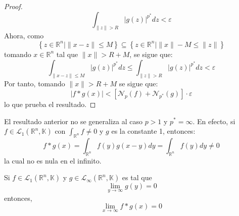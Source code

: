 \documentclass[12pt]{report}
\theoremstyle{largebreak}
\newcommand\abs[1]{\ensuremath{\big|#1\big|}}
\newcommand\norm[1]{\ensuremath{\|#1\|}}
\newcommand{\N}[2]{\ensuremath{\mathcal{N}_{#1}\left(#2\right)}}
\begin{document}
\begin{proof}
        \begin{equation*}
            \int_{ \norm{z}>R}\abs{g(z)}^{p^*}dz<\varepsilon
        \end{equation*}
        Ahora, como 
        \begin{equation*}
            \left\{z\in\mathbb{R}^n\Big|\norm{x-z}\leq M \right\}\subseteq \left\{z\in\mathbb{R}^n\Big|\norm{x}-M\leq\norm{z} \right\}
        \end{equation*}
        tomando $x\in\mathbb{R}^n$ tal que $\norm{x}>R+M$, se sigue que:
        \begin{equation*}
            \int_{\norm{x-z}\leq M }\abs{g(z)}^{ p^*}dz\leq\int_{\norm{z}> R }\abs{g(z)}^{ p^*}dz<\varepsilon
        \end{equation*}
        Por tanto, tomando $\norm{x}>R+M$ se sigue que:
        \begin{equation*}
            \abs{f*g(x)}<\left[\N{p}{f}+\N{p^*}{g} \right]\cdot\varepsilon 
        \end{equation*}
        lo que prueba el resultado.
    \end{proof}

    \begin{obs}
        El resultado anterior no se generaliza al caso $p>1$ y $p^*=\infty$. En efecto, si $f\in\mathcal{L}_1(\mathbb{R}^n,\mathbb{K})$ con $\int_{\mathbb{R}^n}f\neq0$ y $g$ es la constante 1, entonces:
        \begin{equation*}
            f*g(x)=\int_{\mathbb{R}^n}f(y)g(x-y)dy=\int_{\mathbb{R}^n}f(y)dy\neq0
        \end{equation*}
        la cual no es nula en el infinito.
    \end{obs}

    \begin{propo}
        Si $f\in\mathcal{L}_1(\mathbb{R}^n,\mathbb{K})$ y $g\in\mathcal{L}_\infty(\mathbb{R}^n,\mathbb{K})$ es tal que
        \begin{equation*}
            \lim_{y\rightarrow\infty} g(y)=0
        \end{equation*}
        entonces,
        \begin{equation*}
            \lim_{x\rightarrow\infty} f*g(x)=0
        \end{equation*}
    \end{propo}
    
\end{document}
